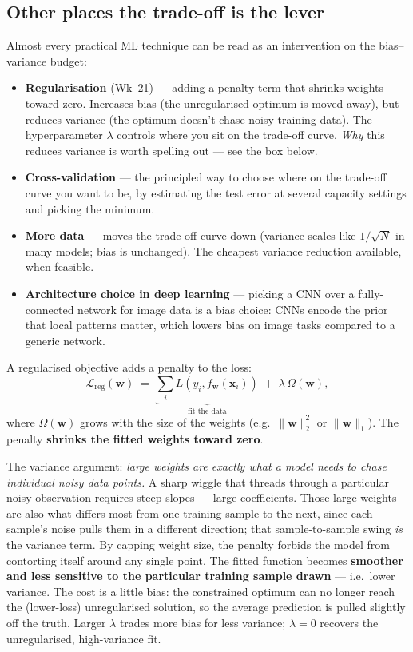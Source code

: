 \documentclass[11pt, a4paper]{article}
\begin{document}
\subsection{Other places the trade-off is the lever}

Almost every practical ML technique can be read as an intervention on the bias--variance budget:

\begin{itemize}
  \item \textbf{Regularisation} (Wk~21) — adding a penalty term that shrinks weights toward zero. Increases bias (the unregularised optimum is moved away), but reduces variance (the optimum doesn't chase noisy training data). The hyperparameter $\lambda$ controls where you sit on the trade-off curve. \emph{Why} this reduces variance is worth spelling out — see the box below.
  \item \textbf{Cross-validation} — the principled way to choose where on the trade-off curve you want to be, by estimating the test error at several capacity settings and picking the minimum.
  \item \textbf{More data} — moves the trade-off curve down (variance scales like $1/\sqrt{N}$ in many models; bias is unchanged). The cheapest variance reduction available, when feasible.
  \item \textbf{Architecture choice in deep learning} — picking a CNN over a fully-connected network for image data is a bias choice: CNNs encode the prior that local patterns matter, which lowers bias on image tasks compared to a generic network.
\end{itemize}

\begin{notebox}
A regularised objective adds a penalty to the loss:
\[
\mathcal{L}_{\text{reg}}(\mathbf{w}) \;=\; \underbrace{\sum_i L(y_i, f_{\mathbf{w}}(\mathbf{x}_i))}_{\text{fit the data}} \;+\; \lambda\,\Omega(\mathbf{w}),
\]
where $\Omega(\mathbf{w})$ grows with the size of the weights (e.g.\ $\|\mathbf{w}\|_2^2$ or $\|\mathbf{w}\|_1$). The penalty \textbf{shrinks the fitted weights toward zero}.

The variance argument: \emph{large weights are exactly what a model needs to chase individual noisy data points.} A sharp wiggle that threads through a particular noisy observation requires steep slopes — large coefficients. Those large weights are also what differs most from one training sample to the next, since each sample's noise pulls them in a different direction; that sample-to-sample swing \emph{is} the variance term. By capping weight size, the penalty forbids the model from contorting itself around any single point. The fitted function becomes \textbf{smoother and less sensitive to the particular training sample drawn} — i.e.\ lower variance. The cost is a little bias: the constrained optimum can no longer reach the (lower-loss) unregularised solution, so the average prediction is pulled slightly off the truth. Larger $\lambda$ trades more bias for less variance; $\lambda = 0$ recovers the unregularised, high-variance fit.
\end{notebox}
\end{document}
